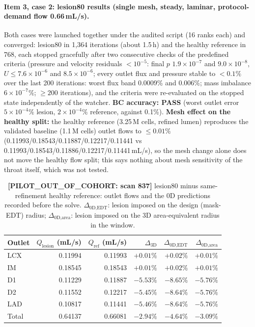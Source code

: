 \documentclass[11pt]{article}
\newcommand{\PASS}{\textcolor{passgreen}{\textbf{PASS}}}
\begin{document}
\paragraph{Item 3, case 2: lesion80 results (single mesh, steady, laminar, protocol-demand flow 0.66\,mL/s).}
\label{sec:lesion80-results}
Both cases were launched together under the audited script (16 ranks each) and converged: lesion80 in 1,364 iterations (about 1.5\,h) and the healthy reference in 768, each stopped gracefully after two consecutive checks of the predefined criteria
(pressure and velocity residuals $<10^{-5}$: final $p$ $1.9\times10^{-7}$ and $9.0\times10^{-8}$, $U\leq7.6\times10^{-6}$ and $8.5\times10^{-6}$; every outlet flux and pressure stable to $<0.1\%$ over the last 200 iterations: worst flux band 0.0009\% and 0.006\%;
mass imbalance $6\times10^{-7}\%$; $\geq200$ iterations), and the criteria were re-evaluated on the stopped state independently of the watcher. \textbf{BC accuracy: \PASS{}} (worst outlet error $5\times10^{-4}\%$ lesion, $2\times10^{-4}\%$ reference, against 0.1\%).
\textbf{Mesh effect on the healthy split:} the healthy reference (3.25\,M cells, refined lumen) reproduces the validated baseline (1.1\,M cells) outlet flows to $\leq0.01\%$ (0.11993/0.18543/0.11887/0.12217/0.11441 vs 0.11993/0.18543/0.11886/0.12217/0.11441\,mL/s), so the mesh change alone does not move the healthy flow split; this says nothing about mesh sensitivity of the throat itself, which was not tested.

\begin{table}[H]
\centering
\caption{\textbf{[PILOT\_OUT\_OF\_COHORT: scan 837]} lesion80 minus same-refinement healthy reference: outlet flows and the 0D predictions recorded before the solve. $\Delta_\text{0D,EDT}$: lesion imposed on the design (mask-EDT) radius; $\Delta_\text{0D,area}$: lesion imposed on the 3D area-equivalent radius in the window.}
\begin{tabular}{lrrrrr}
\toprule
Outlet & $Q_\text{lesion}$ (mL/s) & $Q_\text{ref}$ (mL/s) & $\Delta_\text{3D}$ & $\Delta_\text{0D,EDT}$ & $\Delta_\text{0D,area}$ \\
\midrule
LCX & 0.11994 & 0.11993 & $+0.01\%$ & $+0.02\%$ & $+0.01\%$ \\
IM  & 0.18545 & 0.18543 & $+0.01\%$ & $+0.02\%$ & $+0.01\%$ \\
D1  & 0.11229 & 0.11887 & $-5.53\%$ & $-8.65\%$ & $-5.76\%$ \\
D2  & 0.11552 & 0.12217 & $-5.45\%$ & $-8.64\%$ & $-5.76\%$ \\
LAD & 0.10817 & 0.11441 & $-5.46\%$ & $-8.64\%$ & $-5.76\%$ \\
Total & 0.64137 & 0.66081 & $-2.94\%$ & $-4.64\%$ & $-3.09\%$ \\
\bottomrule
\end{tabular}
\end{table}
\end{document}
